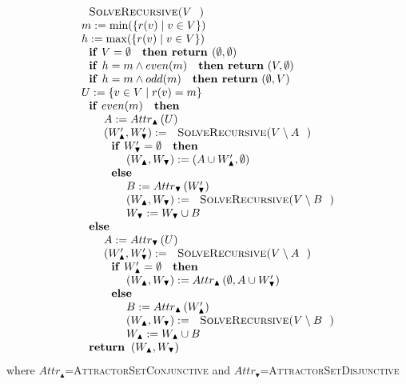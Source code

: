 \begin{equation*}
\begin{array}{l}
\text{\textsc{SolveRecursive(}}V\text{\textsc{)}} \\ 
m:=\min (\{r(v)\mid v\in V\}) \\ 
h:=\max (\{r(v)\mid v\in V\}) \\ 
\text{\textbf{if} }V=\emptyset \text{ \textbf{then return }}(\emptyset
,\emptyset ) \\ 
\text{\textbf{if }}h=m\wedge even(m)\text{ \textbf{then return} }%
(V,\emptyset ) \\ 
\text{\textbf{if }}h=m\wedge odd(m)\text{ \textbf{then return} }(\emptyset
,V) \\ 
U:=\{v\in V\mid r(v)=m\} \\ 
\text{\textbf{if} }even(m)\text{ \textbf{then}} \\ 
\qquad A:=Attr_{\blacktriangle }\left( U\right)  \\ 
\qquad \left( W_{\blacktriangle }^{\prime },W_{\blacktriangledown }^{\prime
}\right) :=\text{\textsc{SolveRecursive(}}V\setminus A\text{)} \\ 
\qquad \text{\textbf{if}  }W_{\blacktriangledown }^{\prime }=\emptyset \text{
\textbf{then}} \\ 
\qquad \qquad \left( W_{\blacktriangle },W_{\blacktriangledown }\right)
:=\left( A\cup W_{\blacktriangle }^{\prime },\emptyset \right)  \\ 
\qquad \text{\textbf{else}} \\ 
\qquad \qquad B:=Attr_{\blacktriangledown }\left( W_{\blacktriangledown
}^{\prime }\right)  \\ 
\qquad \qquad \left( W_{\blacktriangle },W_{\blacktriangledown }\right) :=%
\text{\textsc{SolveRecursive(}}V\setminus B\text{)} \\ 
\qquad \qquad W_{\blacktriangledown }:=W_{\blacktriangledown }\cup B \\ 
\text{\textbf{else}} \\ 
\qquad A:=Attr_{\blacktriangledown }\left( U\right)  \\ 
\qquad \left( W_{\blacktriangle }^{\prime },W_{\blacktriangledown }^{\prime
}\right) :=\text{\textsc{SolveRecursive(}}V\setminus A\text{)} \\ 
\qquad \text{\textbf{if} }W_{\blacktriangle }^{\prime }=\emptyset \text{ 
\textbf{then}} \\ 
\qquad \qquad \left( W_{\blacktriangle },W_{\blacktriangledown }\right)
:=Attr_{\blacktriangle }\left( \emptyset ,A\cup W_{\blacktriangledown
}^{\prime }\right)  \\ 
\qquad \text{\textbf{else}} \\ 
\qquad \qquad B:=Attr_{\blacktriangle }\left( W_{\blacktriangle }^{\prime
}\right)  \\ 
\qquad \qquad \left( W_{\blacktriangle },W_{\blacktriangledown }\right) :=%
\text{\textsc{SolveRecursive(}}V\setminus B\text{)} \\ 
\qquad \qquad W_{\blacktriangle }:=W_{\blacktriangle }\cup B \\ 
\text{\textbf{return }}\left( W_{\blacktriangle },W_{\blacktriangledown
}\right) 
\end{array}%
\end{equation*}%
where $Attr_{\blacktriangle }$=\textsc{AttractorSetConjunctive} and $%
Attr_{\blacktriangledown }$=\textsc{AttractorSetDisjunctive}

\newpage
